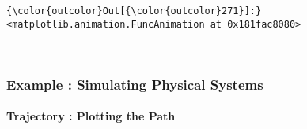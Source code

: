 \documentclass[11pt]{article}
\begin{document}
\begin{Verbatim}[commandchars=\\\{\}]
{\color{outcolor}Out[{\color{outcolor}271}]:} <matplotlib.animation.FuncAnimation at 0x181fac8080>
\end{Verbatim}
            
    \begin{center}
    \end{center}
    { \hspace*{\fill} \\}
    
    \subsubsection{Example : Simulating Physical
Systems}\label{example-simulating-physical-systems}

\paragraph{Trajectory : Plotting the
Path}\label{trajectory-plotting-the-path}
\end{document}
